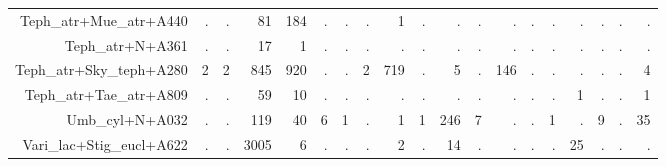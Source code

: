 \documentclass[a4paper, 11]{article}\usepackage[]{graphicx}\usepackage[]{color}
\begin{document}
\begin{table}
\begin{tabular}{rrrrrrrrrrrrrrrrrrr}
  Teph\_atr+Mue\_atr+A440 & . & . & 81 & 184 & . & . & . & 1 & . & . & . & . & . & . & . & . & . & . \\ 
  Teph\_atr+N+A361 & . & . & 17 & 1 & . & . & . & . & . & . & . & . & . & . & . & . & . & . \\ 
  Teph\_atr+Sky\_teph+A280 & 2 & 2 & 845 & 920 & . & . & 2 & 719 & . & 5 & . & 146 & . & . & . & . & . & 4 \\ 
  Teph\_atr+Tae\_atr+A809 & . & . & 59 & 10 & . & . & . & . & . & . & . & . & . & . & 1 & . & . & 1 \\ 
  Umb\_cyl+N+A032 & . & . & 119 & 40 & 6 & 1 & . & 1 & 1 & 246 & 7 & . & . & 1 & . & 9 & . & 35 \\ 
  Vari\_lac+Stig\_eucl+A622 & . & . & 3005 & 6 & . & . & . & 2 & . & 14 & . & . & . & . & 25 & . & . & . \\ 
   \hline
\end{tabular}
\end{table}
\end{document}
